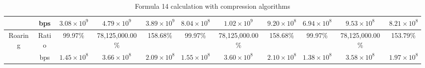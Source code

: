 \begin{table}[h]
{\begin{tabular}{|c|c|c|c|c|c|c|c|c|c|c|}
\cline{2-11}
& bps & $3.08 \times 10^{9}$ & $4.79 \times 10^{9}$ & $3.89 \times 10^{9}$ & $8.04 \times 10^{8}$ & $1.02 \times 10^{9}$ & $9.20 \times 10^{8}$ & $6.94 \times 10^{8}$ & $9.53 \times 10^{8}$ & $8.21 \times 10^{8}$ \\
\hline
\multirow{2}{*}{Roaring} & Ratio & 99.97\% & 78,125,000.00\% & 158.68\% & 99.97\% & 78,125,000.00\% & 158.68\% & 99.97\% & 78,125,000.00\% & 153.79\% \\
\cline{2-11}
& bps & $1.45 \times 10^{8}$ & $3.66 \times 10^{8}$ & $2.09 \times 10^{8}$ & $1.55 \times 10^{8}$ & $3.60 \times 10^{8}$ & $2.10 \times 10^{8}$ & $1.38 \times 10^{8}$ & $3.58 \times 10^{8}$ & $1.97 \times 10^{8}$ \\
\hline
\end{tabular}
}
\caption{Formula 14 calculation with compression algorithms}
\label{tbl:formulacompress14}
\end{table}


